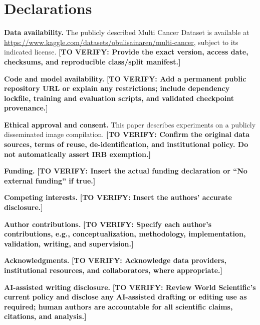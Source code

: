 \documentclass[11pt,a4paper]{article}
\newcommand{\todo}[1]{\textcolor{red!70!black}{\textbf{[TO VERIFY: #1]}}}
\begin{document}
\section*{Declarations}
\noindent\textbf{Data availability.} The publicly described Multi Cancer Dataset is available at \url{https://www.kaggle.com/datasets/obulisainaren/multi-cancer}, subject to its indicated license. \todo{Provide the exact version, access date, checksums, and reproducible class/split manifest.}

\noindent\textbf{Code and model availability.} \todo{Add a permanent public repository URL or explain any restrictions; include dependency lockfile, training and evaluation scripts, and validated checkpoint provenance.}

\noindent\textbf{Ethical approval and consent.} This paper describes experiments on a publicly disseminated image compilation. \todo{Confirm the original data sources, terms of reuse, de-identification, and institutional policy. Do not automatically assert IRB exemption.}

\noindent\textbf{Funding.} \todo{Insert the actual funding declaration or ``No external funding'' if true.}

\noindent\textbf{Competing interests.} \todo{Insert the authors' accurate disclosure.}

\noindent\textbf{Author contributions.} \todo{Specify each author's contributions, e.g., conceptualization, methodology, implementation, validation, writing, and supervision.}

\noindent\textbf{Acknowledgments.} \todo{Acknowledge data providers, institutional resources, and collaborators, where appropriate.}

\noindent\textbf{AI-assisted writing disclosure.} \todo{Review World Scientific's current policy and disclose any AI-assisted drafting or editing use as required; human authors are accountable for all scientific claims, citations, and analysis.}



\appendix
\end{document}

